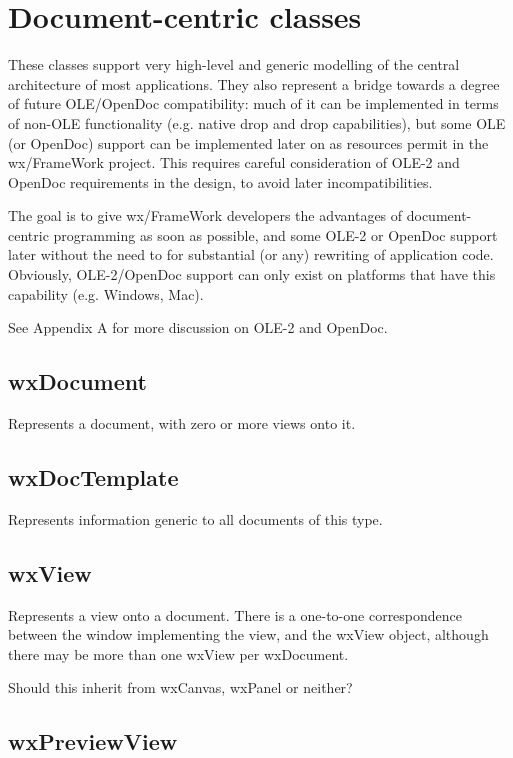 \section{Document-centric classes}

These classes support very high-level and generic modelling of the
central architecture of most applications. They also represent a bridge
towards a degree of future OLE/OpenDoc compatibility: much of it can be
implemented in terms of non-OLE functionality (e.g. native drop and drop
capabilities), but some OLE (or OpenDoc) support can be implemented
later on as resources permit in the wx/FrameWork project. This requires
careful consideration of OLE-2 and OpenDoc requirements in the design,
to avoid later incompatibilities.

The goal is to give wx/FrameWork developers the advantages of
document-centric programming as soon as possible, and some OLE-2 or OpenDoc
support later without the need to for substantial (or any) rewriting of
application code. Obviously, OLE-2/OpenDoc support can only exist on
platforms that have this capability (e.g. Windows, Mac).

See Appendix A for more discussion on OLE-2 and OpenDoc.

\subsection{wxDocument}

Represents a document, with zero or more views onto it.

\subsection{wxDocTemplate}

Represents information generic to all documents of this type.

\subsection{wxView}

Represents a view onto a document. There is a one-to-one correspondence
between the window implementing the view, and the wxView object,
although there may be more than one wxView per wxDocument.

Should this inherit from wxCanvas, wxPanel or neither?

\subsection{wxPreviewView}

